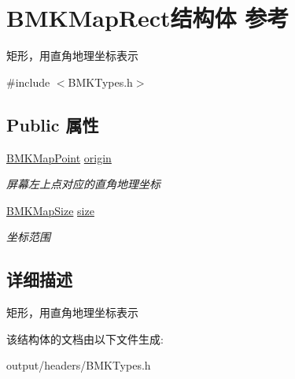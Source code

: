 \hypertarget{struct_b_m_k_map_rect}{}\section{B\+M\+K\+Map\+Rect结构体 参考}
\label{struct_b_m_k_map_rect}


矩形，用直角地理坐标表示  




{\ttfamily \#include $<$B\+M\+K\+Types.\+h$>$}

\subsection*{Public 属性}
\begin{DoxyCompactItemize}
\item 
\hypertarget{struct_b_m_k_map_rect_aeeee8bcaabf5c65e222f1891009325f1}{}\hyperlink{struct_b_m_k_map_point}{B\+M\+K\+Map\+Point} \hyperlink{struct_b_m_k_map_rect_aeeee8bcaabf5c65e222f1891009325f1}{origin}\label{struct_b_m_k_map_rect_aeeee8bcaabf5c65e222f1891009325f1}

\begin{DoxyCompactList}\small\item\em 屏幕左上点对应的直角地理坐标 \end{DoxyCompactList}\item 
\hypertarget{struct_b_m_k_map_rect_ab83b0fb9e6e63b6ab24bdce9ced1e92e}{}\hyperlink{struct_b_m_k_map_size}{B\+M\+K\+Map\+Size} \hyperlink{struct_b_m_k_map_rect_ab83b0fb9e6e63b6ab24bdce9ced1e92e}{size}\label{struct_b_m_k_map_rect_ab83b0fb9e6e63b6ab24bdce9ced1e92e}

\begin{DoxyCompactList}\small\item\em 坐标范围 \end{DoxyCompactList}\end{DoxyCompactItemize}


\subsection{详细描述}
矩形，用直角地理坐标表示 

该结构体的文档由以下文件生成\+:\begin{DoxyCompactItemize}
\item 
output/headers/B\+M\+K\+Types.\+h\end{DoxyCompactItemize}
